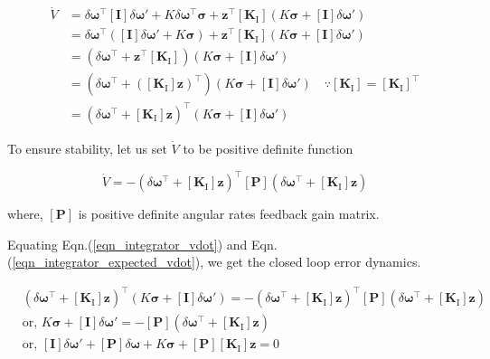 \documentclass{article}
\begin{document}
\begin{equation}
  \label{eqn_integrator_vdot}
  \begin{split}
    \dot{V}&=\delta\bm{\omega}^{\intercal}[\bm{I}]\delta\bm{\omega}'+K\delta\bm{\omega}^{\intercal}\bm{\sigma}+\bm{z}^{\intercal}[\bm{K}_{\text{I}}]\left(K\bm{\sigma}+[\bm{I}]\delta\bm{\omega}'\right)\\
    &=\delta\bm{\omega}^{\intercal}\left([\bm{I}]\delta\bm{\omega}'+K\bm{\sigma}\right)+\bm{z}^{\intercal}[\bm{K}_{\text{I}}]\left(K\bm{\sigma}+[\bm{I}]\delta\bm{\omega}'\right)\\
    &=\left(\delta\bm{\omega}^{\intercal}+\bm{z}^{\intercal}[\bm{K}_{\text{I}}]\right)\left(K\bm{\sigma}+[\bm{I}]\delta\bm{\omega}'\right)\\
    &=\left(\delta\bm{\omega}^{\intercal}+([\bm{K}_{\text{I}}]\bm{z})^{\intercal}\right)\left(K\bm{\sigma}+[\bm{I}]\delta\bm{\omega}'\right)\quad\because[\bm{K}_{\text{I}}]=[\bm{K}_{\text{I}}]^{\intercal}\\
    &=\left(\delta\bm{\omega}^{\intercal}+[\bm{K}_{\text{I}}]\bm{z}\right)^{\intercal}\left(K\bm{\sigma}+[\bm{I}]\delta\bm{\omega}'\right)
  \end{split}
\end{equation}

To ensure stability, let us set $\dot{V}$ to be positive definite function

\begin{equation}
  \label{eqn_integrator_expected_vdot}
  \dot{V}=-\left(\delta\bm{\omega}^{\intercal}+[\bm{K}_{\text{I}}]\bm{z}\right)^{\intercal}[\bm{P}]\left(\delta\bm{\omega}^{\intercal}+[\bm{K}_{\text{I}}]\bm{z}\right)
\end{equation}

where, $[\bm{P}]$ is positive definite angular rates feedback gain matrix.

Equating Eqn.(\ref{eqn_integrator_vdot}) and Eqn.(\ref{eqn_integrator_expected_vdot}), we get the closed loop error dynamics.

\begin{equation*}
  \begin{split}
    &\left(\delta\bm{\omega}^{\intercal}+[\bm{K}_{\text{I}}]\bm{z}\right)^{\intercal}\left(K\bm{\sigma}+[\bm{I}]\delta\bm{\omega}'\right)=-\left(\delta\bm{\omega}^{\intercal}+[\bm{K}_{\text{I}}]\bm{z}\right)^{\intercal}[\bm{P}]\left(\delta\bm{\omega}^{\intercal}+[\bm{K}_{\text{I}}]\bm{z}\right)\\
    &\text{or, }K\bm{\sigma}+[\bm{I}]\delta\bm{\omega}'=-[\bm{P}]\left(\delta\bm{\omega}^{\intercal}+[\bm{K}_{\text{I}}]\bm{z}\right)\\
    &\text{or, }[\bm{I}]\delta\bm{\omega}'+[\bm{P}]\delta\bm{\omega}+K\bm{\sigma}+[\bm{P}][\bm{K}_{\text{I}}]\bm{z}=0\\
  \end{split}
\end{equation*}
\end{document}
